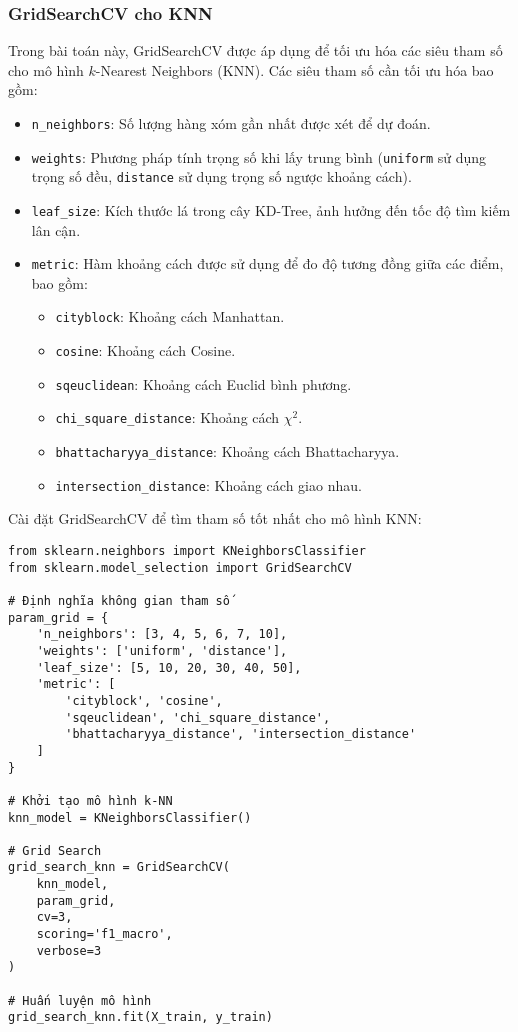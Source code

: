 \documentclass[a4paper,12pt]{article}
\begin{document}
\subsubsection{GridSearchCV cho KNN}  
\hspace{5mm}Trong bài toán này, GridSearchCV được áp dụng để tối ưu hóa các siêu tham số cho mô hình \(k\)-Nearest Neighbors (KNN). Các siêu tham số cần tối ưu hóa bao gồm:  
\begin{itemize}
    \item \texttt{n\_neighbors}: Số lượng hàng xóm gần nhất được xét để dự đoán.
    \item \texttt{weights}: Phương pháp tính trọng số khi lấy trung bình (\texttt{uniform} sử dụng trọng số đều, \texttt{distance} sử dụng trọng số ngược khoảng cách).
    \item \texttt{leaf\_size}: Kích thước lá trong cây KD-Tree, ảnh hưởng đến tốc độ tìm kiếm lân cận.
    \item \texttt{metric}: Hàm khoảng cách được sử dụng để đo độ tương đồng giữa các điểm, bao gồm:
    \begin{itemize}
        \item \texttt{cityblock}: Khoảng cách Manhattan.
        \item \texttt{cosine}: Khoảng cách Cosine.
        \item \texttt{sqeuclidean}: Khoảng cách Euclid bình phương.
        \item \texttt{chi\_square\_distance}: Khoảng cách \(\chi^2\).
        \item \texttt{bhattacharyya\_distance}: Khoảng cách Bhattacharyya.
        \item \texttt{intersection\_distance}: Khoảng cách giao nhau.
    \end{itemize}
\end{itemize}

Cài đặt GridSearchCV để tìm tham số tốt nhất cho mô hình KNN:

\begin{verbatim}
from sklearn.neighbors import KNeighborsClassifier
from sklearn.model_selection import GridSearchCV

# Định nghĩa không gian tham số
param_grid = {
    'n_neighbors': [3, 4, 5, 6, 7, 10],
    'weights': ['uniform', 'distance'],
    'leaf_size': [5, 10, 20, 30, 40, 50],
    'metric': [
        'cityblock', 'cosine',
        'sqeuclidean', 'chi_square_distance',
        'bhattacharyya_distance', 'intersection_distance'
    ]
}

# Khởi tạo mô hình k-NN
knn_model = KNeighborsClassifier()

# Grid Search
grid_search_knn = GridSearchCV(
    knn_model,
    param_grid,
    cv=3,
    scoring='f1_macro',
    verbose=3 
)

# Huấn luyện mô hình
grid_search_knn.fit(X_train, y_train)
\end{verbatim}
\end{document}
